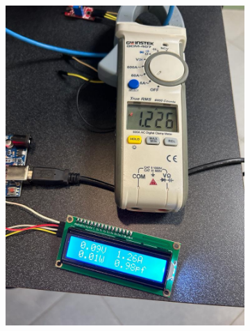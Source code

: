 \begin{figure}
    \centering
    \begin{subfigure}{0.45\textwidth}
        \includegraphics[width=\textwidth]{Imagenes/corriente1.jpeg}
    \end{subfigure}
    \begin{subfigure}{0.45\textwidth}

\end{subfigure}
\end{figure}
